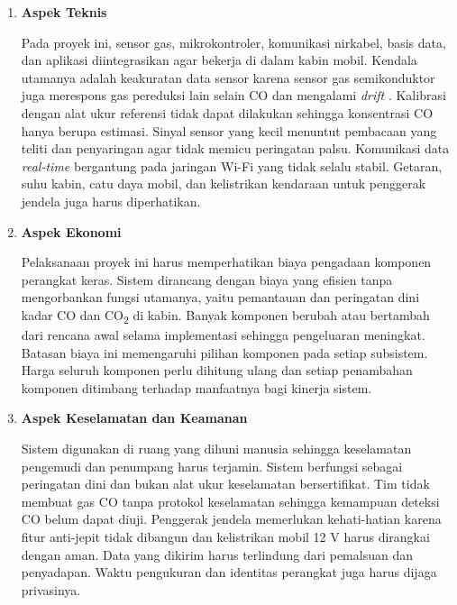     \begin{enumerate}
        \item \textbf{Aspek Teknis}\par
        Pada proyek ini, sensor gas, mikrokontroler, komunikasi nirkabel, basis data, dan aplikasi diintegrasikan agar bekerja di dalam kabin mobil. Kendala utamanya adalah keakuratan data sensor karena sensor gas semikonduktor juga merespons gas pereduksi lain selain CO dan mengalami \textit{drift} \cite{mics5524, mox_drift}. Kalibrasi dengan alat ukur referensi tidak dapat dilakukan sehingga konsentrasi CO hanya berupa estimasi. Sinyal sensor yang kecil menuntut pembacaan yang teliti dan penyaringan agar tidak memicu peringatan palsu. Komunikasi data \textit{real-time} bergantung pada jaringan Wi-Fi yang tidak selalu stabil. Getaran, suhu kabin, catu daya mobil, dan kelistrikan kendaraan untuk penggerak jendela juga harus diperhatikan.
        \item \textbf{Aspek Ekonomi}\par
        Pelaksanaan proyek ini harus memperhatikan biaya pengadaan komponen perangkat keras. Sistem dirancang dengan biaya yang efisien tanpa mengorbankan fungsi utamanya, yaitu pemantauan dan peringatan dini kadar CO dan CO\textsubscript{2} di kabin. Banyak komponen berubah atau bertambah dari rencana awal selama implementasi sehingga pengeluaran meningkat. Batasan biaya ini memengaruhi pilihan komponen pada setiap subsistem. Harga seluruh komponen perlu dihitung ulang dan setiap penambahan komponen ditimbang terhadap manfaatnya bagi kinerja sistem.
        \item \textbf{Aspek Keselamatan dan Keamanan}\par
        Sistem digunakan di ruang yang dihuni manusia sehingga keselamatan pengemudi dan penumpang harus terjamin. Sistem berfungsi sebagai peringatan dini dan bukan alat ukur keselamatan bersertifikat. Tim tidak membuat gas CO tanpa protokol keselamatan sehingga kemampuan deteksi CO belum dapat diuji. Penggerak jendela memerlukan kehati-hatian karena fitur anti-jepit tidak dibangun dan kelistrikan mobil 12 V harus dirangkai dengan aman. Data yang dikirim harus terlindung dari pemalsuan dan penyadapan. Waktu pengukuran dan identitas perangkat juga harus dijaga privasinya.
    \end{enumerate}

